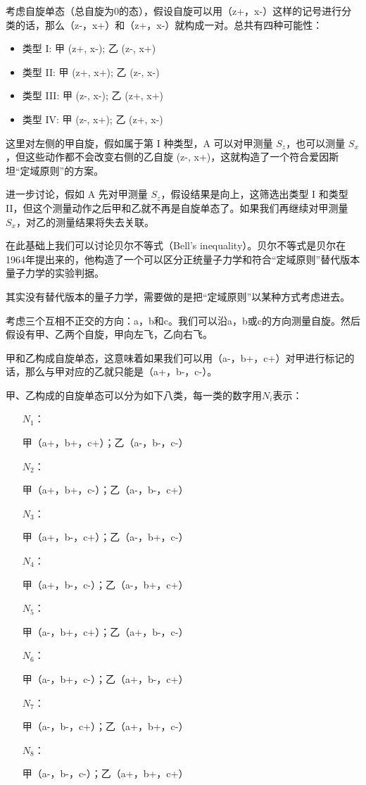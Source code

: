 考虑自旋单态（总自旋为0的态），假设自旋可以用（z+，x-）这样的记号进行分类的话，那么（z-，x+）和（z+，x-）就构成一对。总共有四种可能性：

\begin{itemize}
  \item 类型 I: 甲 (z+, x-);  乙 (z-, x+)
  \item 类型 II: 甲 (z+, x+);  乙 (z-, x-)
  \item 类型 III: 甲 (z-, x-);  乙 (z+, x+)
  \item 类型 IV: 甲 (z-, x+);  乙 (z+, x-)
\end{itemize}

这里对左侧的甲自旋，假如属于第 I 种类型，A 可以对甲测量 $S_z$，也可以测量 $S_x$，但这些动作都不会改变右侧的乙自旋 (z-, x+)，这就构造了一个符合爱因斯坦“定域原则”的方案。

进一步讨论，假如 A 先对甲测量 $S_z$，假设结果是向上，这筛选出类型 I 和类型 II，但这个测量动作之后甲和乙就不再是自旋单态了。如果我们再继续对甲测量 $S_x$，对乙的测量结果将失去关联。

在此基础上我们可以讨论贝尔不等式（Bell's inequality）。贝尔不等式是贝尔在1964年提出来的，他构造了一个可以区分正统量子力学和符合“定域原则”替代版本量子力学的实验判据。

其实没有替代版本的量子力学，需要做的是把“定域原则”以某种方式考虑进去。

考虑三个互相不正交的方向：a，b和c。我们可以沿a，b或c的方向测量自旋。然后假设有甲、乙两个自旋，甲向左飞，乙向右飞。

甲和乙构成自旋单态，这意味着如果我们可以用（a-，b+，c+）对甲进行标记的话，那么与甲对应的乙就只能是（a+，b-，c-）。

甲、乙构成的自旋单态可以分为如下八类，每一类的数字用$N_i$表示：

\begin{itemize}
\item [$N_1$：] 

甲（a+，b+，c+）；乙（a-，b-，c-）

\item [$N_2$：]

甲（a+，b+，c-）；乙（a-，b-，c+）

\item [$N_3$：]

甲（a+，b-，c+）；乙（a-，b+，c-）

\item [$N_4$：]

甲（a+，b-，c-）；乙（a-，b+，c+）

\item [$N_5$：]

甲（a-，b+，c+）；乙（a+，b-，c-）

\item [$N_6$：]

甲（a-，b+，c-）；乙（a+，b-，c+）

\item [$N_7$：]

甲（a-，b-，c+）；乙（a+，b+，c-）

\item [$N_8$：]

甲（a-，b-，c-）；乙（a+，b+，c+）

\end{itemize}

